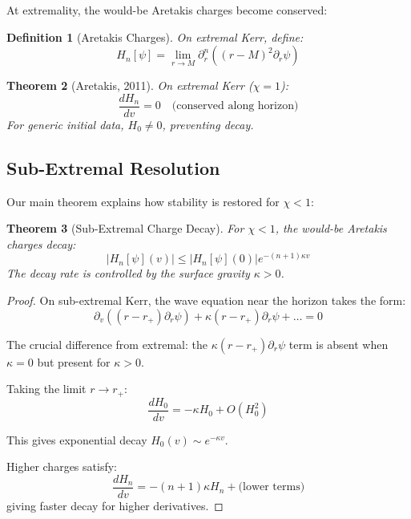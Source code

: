 \documentclass[12pt,a4paper]{article}
\newtheorem{theorem}{Theorem}[section]
\newtheorem{definition}[theorem]{Definition}
\begin{document}
At extremality, the would-be Aretakis charges become conserved:

\begin{definition}[Aretakis Charges]
On extremal Kerr, define:
\begin{equation}
H_n[\psi] = \lim_{r \to M} \partial_r^n((r-M)^2 \partial_r \psi)
\end{equation}
\end{definition}

\begin{theorem}[Aretakis, 2011]
On extremal Kerr ($\chi = 1$):
\begin{equation}
\frac{d H_n}{dv} = 0 \quad \text{(conserved along horizon)}
\end{equation}
For generic initial data, $H_0 \neq 0$, preventing decay.
\end{theorem}

\subsection{Sub-Extremal Resolution}

Our main theorem explains how stability is restored for $\chi < 1$:

\begin{theorem}[Sub-Extremal Charge Decay]\label{thm:charge-decay}
For $\chi < 1$, the would-be Aretakis charges decay:
\begin{equation}
|H_n[\psi](v)| \leq |H_n[\psi](0)| e^{-(n+1)\kappa v}
\end{equation}
The decay rate is controlled by the surface gravity $\kappa > 0$.
\end{theorem}

\begin{proof}
On sub-extremal Kerr, the wave equation near the horizon takes the form:
\begin{equation}
\partial_v\left((r-r_+)\partial_r \psi\right) + \kappa (r-r_+)\partial_r \psi + \ldots = 0
\end{equation}

The crucial difference from extremal: the $\kappa (r-r_+)\partial_r \psi$ term is absent when $\kappa = 0$ but present for $\kappa > 0$.

Taking the limit $r \to r_+$:
\begin{equation}
\frac{d H_0}{dv} = -\kappa H_0 + O(H_0^2)
\end{equation}

This gives exponential decay $H_0(v) \sim e^{-\kappa v}$.

Higher charges satisfy:
\begin{equation}
\frac{d H_n}{dv} = -(n+1)\kappa H_n + \text{(lower terms)}
\end{equation}
giving faster decay for higher derivatives.
\end{proof}
\end{document}
